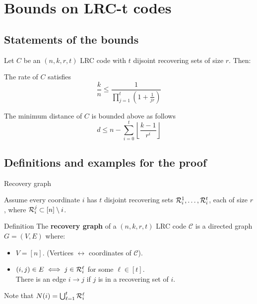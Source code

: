 \section{Bounds on LRC-t codes} 
\subsection{Statements of the bounds}
\begin{frame}
    Let $C$ be an $(n,k,r,t)$ LRC code with $t$ dijsoint recovering sets of size $r$. Then:
    \begin{thm}
        \label{thm:max_rate_t}
        The rate of $C$ satisfies
        $$ \frac{k}{n} \leq \frac{1}{\prod_{j=1}^{t} (1 + \frac{1}{jr} )} $$
    \end{thm}
    
    \begin{thm}
        \label{thm:min_dist_t}
        The minimum distance of $C$ is bounded above as follows
        $$ d \leq n - \sum_{i=0}^{t} \left\lfloor \frac{k-1}{r^i} \right\rfloor $$
    \end{thm}
\end{frame}    
    
\subsection{Definitions and examples for the proof}
\begin{frame}{Recovery graph}

        Assume every coordinate $i$ has $t$ disjoint recovering sets $\mathcal{R}_i^1, \dots, \mathcal{R}_i^t$, each of size $r$, where $\mathcal{R}_i^j \subset \left[n \right] \setminus i$. \pause
        \begin{block}{Definition}
            The \textbf{recovery graph} of a $(n,k,r,t)$ LRC code $\mathcal{C}$ is a directed graph $G=(V,E)$ where: \pause
            \begin{itemize}
                \item $V = \left[n \right]$. (Vertices $\leftrightarrow$ coordinates of $\mathcal{C}$). \pause
                \item $(i,j) \in E \iff j \in \mathcal{R}_i^\ell$ for some $\ell \in \left[ t \right]$.\\ \pause
                There is an edge $i \rightarrow j$ if $j$ is in a recovering set of $i$.\\ \pause
            \end{itemize}    
                Note that $N(i) = \bigcup_{\ell = 1}^{t} \mathcal{R}_i^\ell$
        \end{block}
    \end{frame}    
       

